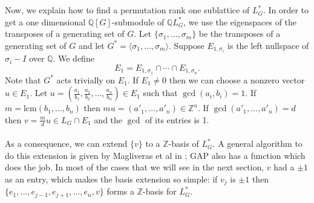\documentclass{article}
\theoremstyle{plain}
\theoremstyle{definition}
\newcommand{\Z}{\ensuremath{\mathbb{Z}}}
\newcommand{\Q}{\ensuremath{\mathbb{Q}}}
\newcommand*{\QEDA}{\hfill\ensuremath{\blacksquare}}
\begin{document}
 \\
\\
Now, we explain how to find a permutation rank one sublattice of $L^*_G$. In order to get a one dimensional $\Q[G]$-submodule of $\Q L^*_G$, we use the eigenspaces of the transposes of a generating set of $G$. Let  $\lbrace \sigma_1, \ldots, \sigma_m\rbrace$ be the transposes of a generating set of $G$ and let  $G^* = \langle \sigma_1, \ldots, \sigma_m\rangle$. Suppose $E_{1,\sigma_i}$ is the left nullspace of $\sigma_i-I$ over $\Q$. We define $$E_1 = E_{1,\sigma_1}\cap \cdots \cap E_{1,\sigma_n}. $$
Note that $G^*$ acts trivially on $E_1$. If $E_1\neq {0}$ then we can choose a nonzero vector $u \in E_1$. Let $u = (\frac{a_1}{b_1}, \frac{a_2}{b_2}, \ldots , \frac{a_n}{b_n})\in E_1$ such that $\gcd(a_i, b_i) = 1$. If $m = \mathrm{lcm}(b_1, \ldots, b_n)$ then $m u = (a'_1, \ldots, a'_n) \in\Z^n$. If $\gcd (a'_1, \ldots, a'_n) = d$ then $v =\frac{m}{d} u \in L_G \cap E_1$ and the $\gcd$ of its entries is 1. \\
\\
As a consequence, we can extend $\lbrace v \rbrace$ to a $\Z$-basis of $L^*_G$. A general algorithm to do this extension is given by Magliveras et al in \cite{LatticeBase}; GAP also has a function which does the job. In most of the cases that we will see in the next section, $v$ had a $\pm 1$ as an entry, which makes the basis extension so simple: if $v_j$ is $\pm 1$ then $\lbrace e_1, \ldots , e_{j-1}, e_{j+1}, \ldots, e_n , v \rbrace$ forms a $\Z$-basis for $L^*_G$.\\
\end{document}
